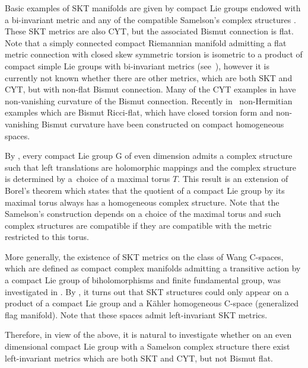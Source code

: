 \documentclass[10pt,a4paper]{amsart}
\numberwithin{equation}{section}
\begin{document}
Basic examples of SKT manifolds are given by compact Lie groups endowed with a bi-invariant metric and any of the compatible Samelson’s complex structures \cite{Samelson}. These SKT metrics are also CYT, but the associated Bismut connection is flat. Note that a simply connected compact Riemannian manifold admitting a flat metric connection with closed skew symmetric torsion is isometric to a product of compact simple Lie groups with bi-invariant metrics (see~\cite[Theorem~3.54]{GS}),
however it is currently not known whether there are other metrics, which are both SKT and CYT, but with non-flat Bismut connection. Many of the CYT examples in \cite{Grantcharov} have non-vanishing curvature of the Bismut connection. Recently in~\cite{PR, PR2} non-Hermitian examples which are Bismut Ricci-flat, which have closed torsion form and non-vanishing Bismut curvature have been constructed on compact homogeneous spaces.

By \cite{Samelson}, every compact Lie group G of even dimension admits a complex structure such that left translations are holomorphic mappings and the complex structure is determined by a~choice of a maximal torus $T$. This result is an extension of Borel's theorem which states that the quotient of a compact Lie group by its maximal torus always has a homogeneous complex structure.
Note that the Samelson’s construction depends on a choice of the maximal torus and such complex structures are compatible if they are compatible with the metric restricted to this torus.

More generally, the existence of SKT metrics on the class of Wang C-spaces, which are defined as compact complex manifolds admitting a transitive action by a compact Lie group of biholomorphisms and finite fundamental group, was investigated in \cite{FGV}. By \cite{FGV}, it turns out that SKT structures could only appear on a product of a compact Lie group and a K\"ahler homogeneous C-space (generalized flag manifold). Note that these spaces admit left-invariant SKT metrics.

Therefore, in view of the above, it is natural to investigate whether on an even dimensional compact Lie group with a Samelson complex structure there exist left-invariant metrics which are both SKT and CYT, but not Bismut flat.
\end{document}

